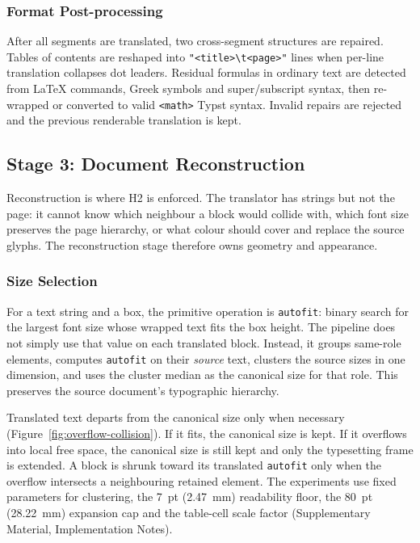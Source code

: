 \subsubsection{Format Post-processing}

After all segments are translated, two cross-segment structures are repaired.
Tables of contents are reshaped into \verb|"<title>\t<page>"| lines when
per-line translation collapses dot leaders. Residual formulas in ordinary text
are detected from LaTeX commands, Greek symbols and super/subscript syntax, then
re-wrapped or converted to valid \texttt{<math>} Typst syntax. Invalid repairs
are rejected and the previous renderable translation is kept.

\subsection{Stage 3: Document Reconstruction}
\label{subsec:method-render}

Reconstruction is where H2 is enforced. The translator has strings but not the
page: it cannot know which neighbour a block would collide with, which font size
preserves the page hierarchy, or what colour should cover and replace the source
glyphs. The reconstruction stage therefore owns geometry and appearance.

\subsubsection{Size Selection}
\label{subsubsec:sizing}

For a text string and a box, the primitive operation is \texttt{autofit}: binary
search for the largest font size whose wrapped text fits the box height. The
pipeline does not simply use that value on each translated block. Instead, it
groups same-role elements, computes \texttt{autofit} on their \emph{source} text,
clusters the source sizes in one dimension, and uses the cluster median as the
canonical size for that role. This preserves the source document's typographic
hierarchy.

Translated text departs from the canonical size only when necessary
(Figure~\ref{fig:overflow-collision}). If it fits, the canonical size is kept.
If it overflows into local free space, the canonical size is still kept and only
the typesetting frame is extended. A block is shrunk toward its translated
\texttt{autofit} only when the overflow intersects a neighbouring retained
element. The experiments use fixed parameters for clustering, the 7~pt
(2.47~mm) readability floor, the 80~pt (28.22~mm) expansion cap and the
table-cell scale factor
(Supplementary Material, Implementation Notes).

